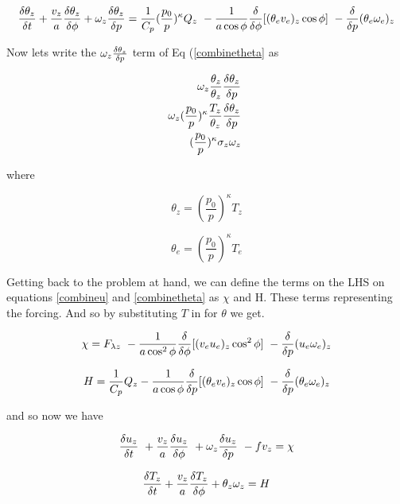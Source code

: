 \documentclass{article}
\begin{document}
\begin{equation}
\frac{\delta \theta_z}{\delta t} + \frac {v_z}{a} \frac{\delta \theta_z}{\delta \phi}
+ \omega_z \frac{\delta \theta_z}{\delta p}
= \frac{1}{C_p} (\frac{p_0}{p})^\kappa Q_z \
- \frac{1}{a\cos{\phi}} \frac{\delta}{\delta \phi} [ (\theta_e v_e)_z \cos {\phi} ] \
- \frac{\delta}{\delta p} (\theta_e \omega_e )_z
\label{combinetheta}
\end{equation}

Now lets write the $\omega_z\frac{\delta \theta_z}{\delta p}$ term of Eq (\ref{combinetheta} as

\begin{eqnarray}
\omega_z \frac{\theta_z}{\theta_z} \frac{\delta \theta_z}{\delta p} \
\nonumber\\
\omega_z (\frac{p_0}{p})^\kappa \frac{T_z}{\theta_z}\frac{\delta \theta_z}{\delta p} \
\nonumber\\
(\frac{p_0}{p})^\kappa \sigma_z \omega_z \
\nonumber
\end{eqnarray}

where 

\begin{equation}
\theta_z =  (\frac{p_0}{p})^\kappa T_z
\end{equation}

\begin{equation}
\theta_e =  (\frac{p_0}{p})^\kappa T_e
\end{equation}

Getting back to the problem at hand, we can define the terms on the LHS on
equations \ref{combineu} and \ref{combinetheta} as $\chi$ and H. These 
terms representing the forcing. And so by
substituting $T$ in for $\theta$ we get.

\begin{equation}
\chi =  F_{\lambda z} \
- \frac{1}{a\cos^2{\phi}} \frac{\delta}{\delta \phi} [ ( v_e u_e )_z \cos^2 \phi ] \
- \frac{\delta}{\delta p} (u_e \omega_e )_z
\end{equation}

\begin{equation}
H = \frac{1}{C_p} Q_z - \frac{1}{a\cos{\phi}} \frac{\delta}{\delta p} [ (\theta_e v_e)_z \cos {\phi} ] \
- \frac{\delta}{\delta p} (\theta_e \omega_e )_z
\end{equation}

and so now we have

\begin{equation}
\frac{\delta u_z}{\delta t} \
+ \frac{v_z}{a} \frac{\delta u_z}{\delta \phi} \
+ \omega_z \frac{\delta u_z}{\delta p} \
- fv_z = \chi
\label{four}
\end{equation}

\begin{equation}
\frac{\delta T_z}{\delta t} + \frac{v_z}{a} \frac{\delta T_z}{\delta \phi} + \theta_z \omega_z = H
\label{five}
\end{equation}
\end{document}
